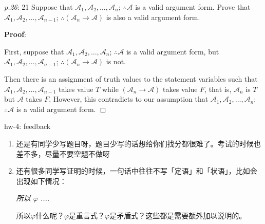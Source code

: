 \documentclass[UTF8,12pt,a4paper]{ctexart}
\begin{document}
\vspace{3em}

\emph{p.26}: 21 \quad
Suppose that $\mathscr{A}_1,\mathscr{A}_2,\dots,\mathscr{A}_n$;  $\therefore\mathscr{A}$ is a valid argument form. Prove that $\mathscr{A}_1,\mathscr{A}_2,\dots,\mathscr{A}_{n-1}$;  $\therefore (\mathscr{A}_n \to \mathscr{A})$ is also a valid argument form.

\noindent\textbf{Proof}:

First, suppose that $\mathscr{A}_1,\mathscr{A}_2,\dots,\mathscr{A}_n$;  $\therefore\mathscr{A}$ is a valid argument form, but $\mathscr{A}_1,\mathscr{A}_2,\dots,\mathscr{A}_{n-1}$;  $\therefore (\mathscr{A}_n \to \mathscr{A})$ is not. 

Then there is an assignment of truth values to the statement variables such that 
$\mathscr{A}_1,\mathscr{A}_2,\dots,\mathscr{A}_{n-1}$ takes value $T$ 
while $(\mathscr{A}_n \to \mathscr{A})$ takes value $F$, that is, 
$\mathscr{A}_n $ is $T$ but $\mathscr{A}$ takes $F$. 
However, this contradicts to our assumption that $\mathscr{A}_1,\mathscr{A}_2,\dots,\mathscr{A}_n$;  $\therefore\mathscr{A}$ is a valid argument form.
\hfill $\Box$


\vspace{1em}
\dotfill
hw-4: feedback
\dotfill

\begin{enumerate}
	\item 还是有同学少写题目呀，题目少写的话想给你们找分都很难了。考试的时候也差不多，尽量不要空题不做呀 \faSadTear[regular]
	
	\item 还有很多同学写证明的时候，一句话中往往不写「定语」和「状语」，比如会出现如下情况：
	\begin{center}
		\textit{所以 $\varphi$ .... } 
	\end{center}
	所以$\varphi$什么呢？$\varphi$是重言式？$\varphi$是矛盾式？这些都是需要额外加以说明的。
\end{enumerate}
\end{document}
